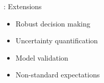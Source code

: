 \begin{frame}{\insertsection: Extensions}

\begin{itemize}
\item Robust decision making
\item Uncertainty quantification
\item Model validation
\item Non-standard expectations
\end{itemize}
\end{frame}
